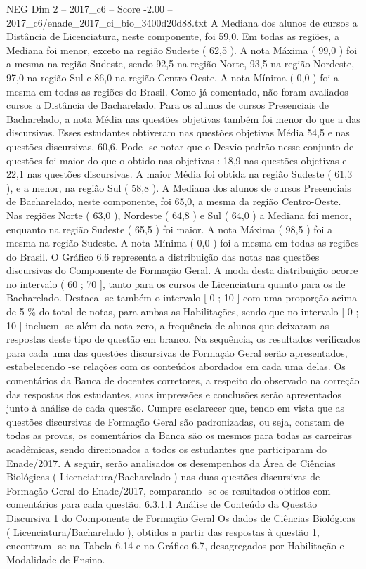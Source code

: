 \begin{textsample}{NEG Dim 2 – 2017\_c6 – Score -2.00 – 2017\_c6/enade\_2017\_ci\_bio\_3400d20d88.txt}
A Mediana dos alunos de cursos a Distância de Licenciatura, neste componente, foi 59,0.
Em todas as regiões, a Mediana foi menor, exceto na região Sudeste ( 62,5 ).
A nota Máxima ( 99,0 ) foi a mesma na região Sudeste, sendo 92,5 na região Norte, 93,5 na região Nordeste, 97,0 na região Sul e 86,0 na região Centro-Oeste.
A nota Mínima ( 0,0 ) foi a mesma em todas as regiões do Brasil.
Como já comentado, não foram avaliados cursos a Distância de Bacharelado.
Para os alunos de cursos Presenciais de Bacharelado, a nota Média nas questões objetivas também foi menor do que a das discursivas.
Esses estudantes obtiveram nas questões objetivas Média 54,5 e nas questões discursivas, 60,6.
Pode -se notar que o Desvio padrão nesse conjunto de questões foi maior do que o obtido nas objetivas : 18,9 nas questões objetivas e 22,1 nas questões discursivas.
A maior Média foi obtida na região Sudeste ( 61,3 ), e a menor, na região Sul ( 58,8 ).
A Mediana dos alunos de cursos Presenciais de Bacharelado, neste componente, foi 65,0, a mesma da região Centro-Oeste.
Nas regiões Norte ( 63,0 ), Nordeste ( 64,8 ) e Sul ( 64,0 ) a Mediana foi menor, enquanto na região Sudeste ( 65,5 ) foi maior.
A nota Máxima ( 98,5 ) foi a mesma na região Sudeste.
A nota Mínima ( 0,0 ) foi a mesma em todas as regiões do Brasil.
O Gráfico 6.6 representa a distribuição das notas nas questões discursivas do Componente de Formação Geral.
A moda desta distribuição ocorre no intervalo ( 60 ; 70 ], tanto para os cursos de Licenciatura quanto para os de Bacharelado.
Destaca -se também o intervalo [ 0 ; 10 ] com uma proporção acima de 5 \% do total de notas, para ambas as Habilitações, sendo que no intervalo [ 0 ; 10 ] incluem -se além da nota zero, a frequência de alunos que deixaram as respostas deste tipo de questão em branco.
Na sequência, os resultados verificados para cada uma das questões discursivas de Formação Geral serão apresentados, estabelecendo -se relações com os conteúdos abordados em cada uma delas.
Os comentários da Banca de docentes corretores, a respeito do observado na correção das respostas dos estudantes, suas impressões e conclusões serão apresentados junto à análise de cada questão.
Cumpre esclarecer que, tendo em vista que as questões discursivas de Formação Geral são padronizadas, ou seja, constam de todas as provas, os comentários da Banca são os mesmos para todas as carreiras acadêmicas, sendo direcionados a todos os estudantes que participaram do Enade/2017.
A seguir, serão analisados os desempenhos da Área de Ciências Biológicas ( Licenciatura/Bacharelado ) nas duas questões discursivas de Formação Geral do Enade/2017, comparando -se os resultados obtidos com comentários para cada questão. 6.3.1.1 Análise de Conteúdo da Questão Discursiva 1 do Componente de Formação Geral Os dados de Ciências Biológicas ( Licenciatura/Bacharelado ), obtidos a partir das respostas à questão 1, encontram -se na Tabela 6.14 e no Gráfico 6.7, desagregados por Habilitação e Modalidade de Ensino.

\end{textsample}
